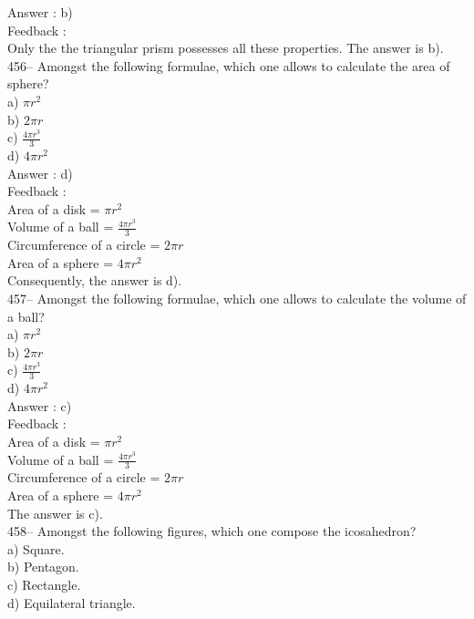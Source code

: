 \documentclass[letterpaper, 12pt]{article}
\begin{document}
Answer : b)\\

Feedback :\\
Only the the triangular prism possesses all these properties. The answer is b).\\

456-- Amongst the following formulae, which one allows to calculate the area of sphere?\\
a) $\pi r^{2}$\\
b) $2\pi r$\\
c) $\frac{4\pi r^{3}}{3}$\\
d) $4\pi r^{2}$\\

Answer : d)\\

Feedback : \\
Area of a disk =  $\pi r^{2}$\\[2mm]
Volume of a ball = $\frac{4\pi r^{3}}{3}$\\[2mm]
Circumference of a circle = $2\pi r$\\[2mm]
Area of a sphere = $4\pi r^{2}$\\[2mm]
Consequently, the answer is d).\\

457-- Amongst the following formulae, which one allows to calculate the volume of a ball?\\
a) $\pi r^{2}$\\
b) $2\pi r$\\
c) $\frac{4\pi r^{3}}{3}$\\
d) $4\pi r^{2}$\\

Answer : c)\\

Feedback : \\
Area of a disk =  $\pi r^{2}$\\[2mm]
Volume of a ball = $\frac{4\pi r^{3}}{3}$\\[2mm]
Circumference of a circle = $2\pi r$\\[2mm]
Area of a sphere = $4\pi r^{2}$\\[2mm]
The answer is c).\\

458-- Amongst the following figures, which one compose the icosahedron?\\
a) Square.\\
b) Pentagon.\\
c) Rectangle.\\
d) Equilateral triangle.\\
\end{document}
